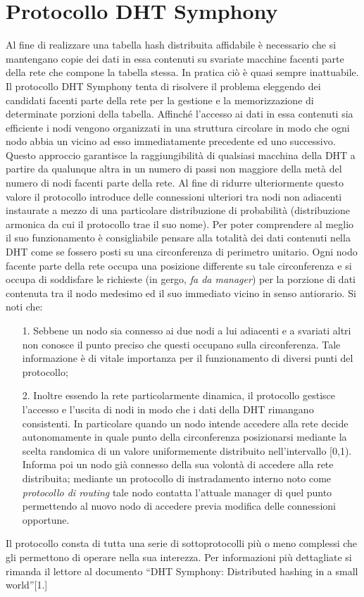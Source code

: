 \documentclass[	
	DIV=calc,
	paper=a4,
	fontsize=11pt,
	onecolumn
]{scrartcl} %
\begin{document}
\section{Protocollo DHT Symphony}
	Al fine di realizzare una tabella hash distribuita affidabile è necessario che si mantengano copie dei dati in essa contenuti su svariate macchine facenti parte della rete che compone la tabella stessa. In pratica ciò è quasi sempre inattuabile. Il protocollo DHT Symphony tenta di risolvere il problema eleggendo dei candidati facenti parte della rete per la gestione e la memorizzazione di determinate porzioni della tabella. Affinché l'accesso ai dati in essa contenuti sia efficiente i nodi vengono organizzati in una struttura circolare in modo che ogni nodo abbia un vicino ad esso immediatamente precedente ed uno successivo. Questo approccio garantisce la raggiungibilità di qualsiasi macchina della DHT a partire da qualunque altra in un numero di passi non maggiore della metà del numero di nodi facenti parte della rete. Al fine di ridurre ulteriormente questo valore il protocollo introduce delle connessioni ulteriori tra nodi non adiacenti instaurate a mezzo di una particolare distribuzione di probabilità (distribuzione armonica da cui il protocollo trae il suo nome). Per poter comprendere al meglio il suo funzionamento è consigliabile pensare alla totalità dei dati contenuti nella DHT come se fossero posti su una circonferenza di perimetro unitario. Ogni nodo facente parte della rete occupa una posizione differente su tale circonferenza e si occupa di soddisfare le richieste (in gergo, \textit{fa da manager}) per la porzione di dati contenuta tra il nodo medesimo ed il suo immediato vicino in senso antiorario. Si noti che:
\begin{itemize}
	\item[1.] Sebbene un nodo sia connesso ai due nodi a lui adiacenti e a svariati altri non conosce il punto preciso che questi occupano sulla circonferenza. Tale informazione è di vitale importanza per il funzionamento di diversi punti del protocollo;
	\item[2.] Inoltre essendo la rete particolarmente dinamica, il protocollo gestisce l'accesso e l'uscita di nodi in modo che i dati della DHT rimangano consistenti. In particolare quando un nodo intende accedere alla rete decide autonomamente in quale punto della circonferenza posizionarsi mediante la scelta randomica di un valore uniformemente distribuito nell'intervallo [0,1). Informa poi un nodo già connesso della sua volontà di accedere alla rete distribuita; mediante un protocollo di instradamento interno noto come \textit{protocollo di routing} tale nodo contatta l'attuale manager di quel punto permettendo al nuovo nodo di accedere previa modifica delle connessioni opportune.
\end{itemize}
Il protocollo consta di tutta una serie di sottoprotocolli più o meno complessi che gli permettono di operare nella sua interezza. Per informazioni più dettagliate si rimanda il lettore al documento ``DHT Symphony: Distributed hashing in a small world''[1.]
\end{document}
